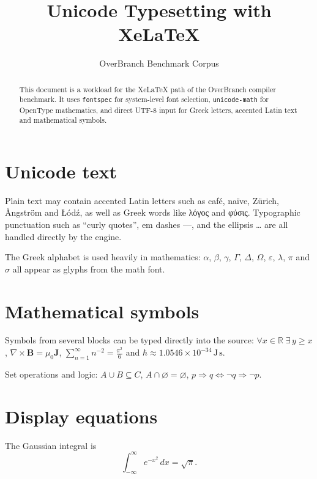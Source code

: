 \documentclass[11pt,a4paper]{article}
\title{Unicode Typesetting with XeLaTeX}
\author{OverBranch Benchmark Corpus}
\date{}
\begin{document}
\maketitle

\begin{abstract}
  This document is a workload for the XeLaTeX path of the OverBranch compiler
  benchmark. It uses \texttt{fontspec} for system-level font selection,
  \texttt{unicode-math} for OpenType mathematics, and direct UTF-8 input for
  Greek letters, accented Latin text and mathematical symbols.
\end{abstract}

\section{Unicode text}

Plain text may contain accented Latin letters such as café, naïve, Zürich,
Ångström and Łódź, as well as Greek words like λόγος and
φύσις. Typographic punctuation such as “curly quotes”, em
dashes —, and the ellipsis … are all handled directly by the engine.

The Greek alphabet is used heavily in mathematics: $\alpha$, $\beta$, $\gamma$,
$\Gamma$, $\Delta$, $\Omega$, $\varepsilon$, $\lambda$, $\pi$ and $\sigma$
all appear as glyphs from the math font.

\section{Mathematical symbols}

Symbols from several blocks can be typed directly into the source:
$\forall x \in \mathbb{R}\;\exists\, y \ge x$, $\nabla \times \mathbf{B} = \mu_0 \mathbf{J}$,
$\sum_{n=1}^{\infty} n^{-2} = \tfrac{\pi^2}{6}$ and $\hbar \approx 1.0546 \times 10^{-34}\,\mathrm{J\,s}$.

Set operations and logic: $A \cup B \subseteq C$, $A \cap \varnothing = \varnothing$,
$p \Rightarrow q \Leftrightarrow \lnot q \Rightarrow \lnot p$.

\section{Display equations}

The Gaussian integral is
\begin{equation}\label{eq:gauss}
  \int_{-\infty}^{\infty} e^{-x^2}\,dx = \sqrt{\pi}.
\end{equation}
\end{document}
